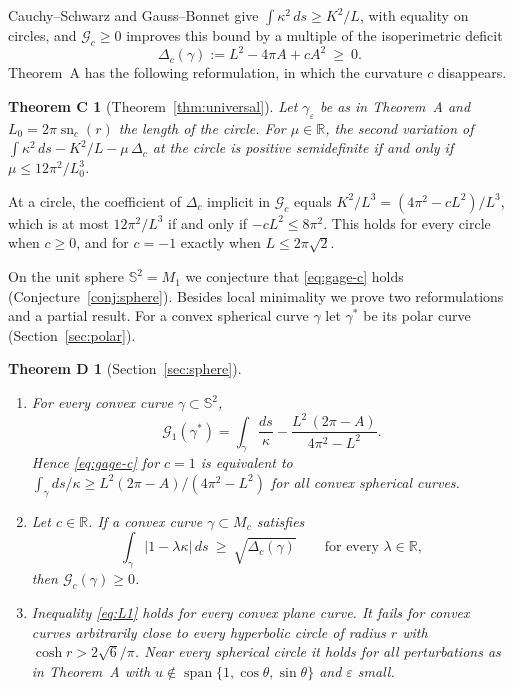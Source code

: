 \documentclass[11pt]{amsart}
\newtheorem*{theoremC}{Theorem C}
\newtheorem*{theoremD}{Theorem D}
\theoremstyle{definition}
\theoremstyle{remark}
\numberwithin{equation}{section}
\DeclareMathOperator{\sn}{sn}
\DeclareMathOperator{\spn}{span}
\newcommand{\RR}{\mathbb{R}}
\newcommand{\Sph}{\mathbb{S}}
\newcommand{\eps}{\varepsilon}
\newcommand{\G}{\mathcal{G}}
\begin{document}
Cauchy--Schwarz and Gauss--Bonnet give $\int\kappa^2\,ds\ge K^2/L$, with equality on circles, and $\G_c\ge0$ improves this bound by a multiple of the isoperimetric deficit
\[
\Delta_c(\gamma):=L^2-4\pi A+cA^2\ \ge\ 0 .
\]
Theorem~A has the following reformulation, in which the curvature $c$ disappears.

\begin{theoremC}[Theorem~\ref{thm:universal}]
Let $\gamma_\eps$ be as in Theorem~A and $L_0=2\pi\sn_c(r)$ the length of the circle. For $\mu\in\RR$, the second variation of $\int\kappa^2\,ds-K^2/L-\mu\,\Delta_c$ at the circle is positive semidefinite if and only if $\mu\le 12\pi^2/L_0^3$.
\end{theoremC}

At a circle, the coefficient of $\Delta_c$ implicit in $\G_c$ equals $K^2/L^3=(4\pi^2-cL^2)/L^3$, which is at most $12\pi^2/L^3$ if and only if $-cL^2\le 8\pi^2$. This holds for every circle when $c\ge0$, and for $c=-1$ exactly when $L\le 2\pi\sqrt2$.

On the unit sphere $\Sph^2=M_1$ we conjecture that \eqref{eq:gage-c} holds (Conjecture~\ref{conj:sphere}). Besides local minimality we prove two reformulations and a partial result. For a convex spherical curve $\gamma$ let $\gamma^*$ be its polar curve (Section~\ref{sec:polar}).

\begin{theoremD}[Section~\ref{sec:sphere}]\leavevmode
\begin{enumerate}[label=\textup{(\roman*)}]
\item For every convex curve $\gamma\subset\Sph^2$,
\[
\G_1(\gamma^*)=\int_\gamma\frac{ds}{\kappa}-\frac{L^2\,(2\pi-A)}{4\pi^2-L^2}.
\]
Hence \eqref{eq:gage-c} for $c=1$ is equivalent to $\int_\gamma ds/\kappa\ge L^2(2\pi-A)/(4\pi^2-L^2)$ for all convex spherical curves.
\item Let $c\in\RR$. If a convex curve $\gamma\subset M_c$ satisfies
\begin{equation}\label{eq:L1}
\int_\gamma|1-\lambda\kappa|\,ds\ \ge\ \sqrt{\Delta_c(\gamma)}\qquad\text{for every }\lambda\in\RR,
\end{equation}
then $\G_c(\gamma)\ge0$.
\item Inequality \eqref{eq:L1} holds for every convex plane curve. It fails for convex curves arbitrarily close to every hyperbolic circle of radius $r$ with $\cosh r>2\sqrt6/\pi$. Near every spherical circle it holds for all perturbations as in Theorem~A with $u\notin\spn\{1,\cos\theta,\sin\theta\}$ and $\eps$ small.
\end{enumerate}
\end{theoremD}
\end{document}
